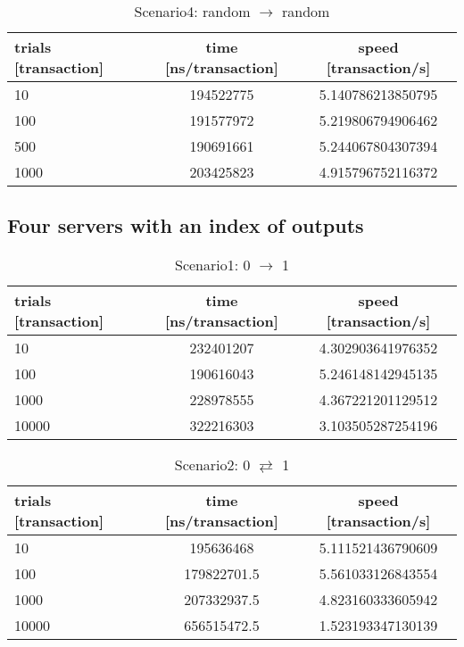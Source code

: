 \documentclass[a4j,11pt,uplatex,onecolumn]{article}
\begin{document}
\begin{table}[htb]
  \begin{center}
    \caption{Scenario4: random $\rightarrow$ random}
    \begin{tabular}{|l|c|c|} \hline
        trials [transaction] & time [ns/transaction] & speed [transaction/s]\\ \hline \hline
        10 & 194522775 & 5.140786213850795\\
        100 & 191577972 & 5.219806794906462\\
        500 & 190691661 & 5.244067804307394\\
        1000 & 203425823 & 4.915796752116372\\ \hline
    \end{tabular}
  \end{center}
\end{table}

\subsection{Four servers with an index of outputs}
\begin{table}[htb]
  \begin{center}
    \caption{Scenario1: 0 $\rightarrow$ 1}
    \begin{tabular}{|l|c|c|} \hline
        trials [transaction] & time [ns/transaction] & speed [transaction/s]\\ \hline \hline
        10 & 232401207 & 4.302903641976352 \\
        100 & 190616043 & 5.246148142945135 \\
        1000 & 228978555 & 4.367221201129512 \\ 
        10000 & 322216303 & 3.103505287254196 \\ \hline
    \end{tabular}
  \end{center}
\end{table}

\begin{table}[htb]
  \begin{center}
    \caption{Scenario2: 0 $\rightleftarrows$ 1}
    \begin{tabular}{|l|c|c|} \hline
        trials [transaction] & time [ns/transaction] & speed [transaction/s]\\ \hline \hline
        10 & 195636468 & 5.111521436790609 \\
        100 & 179822701.5 & 5.561033126843554 \\
        1000 & 207332937.5 & 4.823160333605942 \\
        10000 & 656515472.5 & 1.523193347130139\\ \hline
    \end{tabular}
  \end{center}
\end{table}
\end{document}
